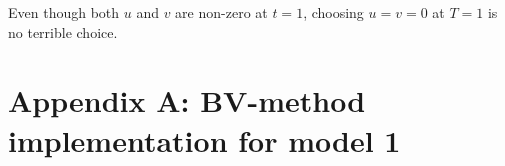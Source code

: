 \documentclass{article}
\renewcommand{\(}{\left(}
\renewcommand{\)}{\right)}
\begin{document}
Even though both $u$ and $v$ are non-zero at $t=1$, choosing $u = v = 0$ at $T=1$ is no terrible choice. %
\section*{Appendix A: BV-method implementation for model 1}

\end{document}

